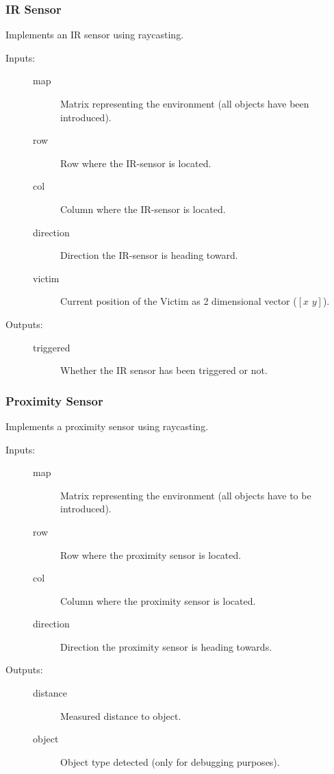 \documentclass[a4paper,parskip,headheight=38pt]{scrartcl} %
\begin{document}
\subsubsection{IR Sensor}
Implements an IR sensor using raycasting.
\begin{description}
\item[Inputs:] \hfill
	\begin{description}
	\item[map] Matrix representing the environment (all objects have been introduced).
	\item[row] Row where the IR-sensor is located.
	\item[col] Column where the IR-sensor is located.
	\item[direction] Direction the IR-sensor is heading toward.
	\item[victim] Current position of the Victim as 2 dimensional vector ($[x\,\, y]$). 
	\end{description}
\item[Outputs:] \hfill
	\begin{description}
	\item[triggered] Whether the IR sensor has been triggered or not.
	\end{description}
\end{description}

\subsubsection{Proximity Sensor}
Implements a proximity sensor using raycasting.
\begin{description}
\item[Inputs:] \hfill
	\begin{description}
	\item[map] Matrix representing the environment (all objects have to be introduced).
	\item[row] Row where the proximity sensor is located.
	\item[col] Column where the proximity sensor is located.
	\item[direction] Direction the proximity sensor is heading towards.
	\end{description}
\item[Outputs:] \hfill
	\begin{description}
	\item[distance] Measured distance to object.
	\item[object] Object type detected (only for debugging purposes).
	\end{description}
\end{description}
\end{document}
